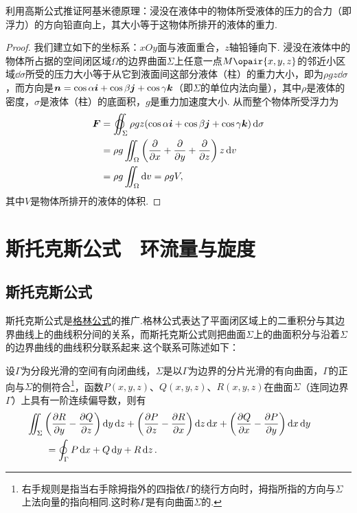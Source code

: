 \begin{example}
利用高斯公式推证阿基米德原理：浸没在液体中的物体所受液体的压力的合力（即浮力）的方向铅直向上，其大小等于这物体所排开的液体的重力.
\begin{proof}
我们建立如下的坐标系：\(xOy\)面与液面重合，\(z\)轴铅锤向下.
浸没在液体中的物体所占据的空间闭区域\(\Omega\)的边界曲面\(\Sigma\)上任意一点\(M\opair{x,y,z}\)的邻近小区域\(\dd{\sigma}\)所受的压力大小等于从它到液面间这部分液体（柱）的重力大小，即为\(\rho g z \dd{\sigma}\)，而方向是\(\boldsymbol{n}=\cos\alpha\boldsymbol{i}+\cos\beta\boldsymbol{j}+\cos\gamma\boldsymbol{k}\)（即\(\Sigma\)的单位内法向量），其中\(\rho\)是液体的密度，\(\sigma\)是液体（柱）的底面积，\(g\)是重力加速度大小.
从而整个物体所受浮力为\begin{align*}
\mat{F} &= \varoiint_{\Sigma} \rho g z (\cos\alpha\mat{i}+\cos\beta\mat{j}+\cos\gamma\mat{k}) \dd{\sigma} \\
&= \rho g \iint_{\Omega} \left(\pdv{x}+\pdv{y}+\pdv{z}\right) z \dd{v} \\
&= \rho g \iint_{\Omega} \dd{v}
= \rho g V,
\end{align*}其中\(V\)是物体所排开的液体的体积.
\end{proof}
\end{example}

\section{斯托克斯公式　环流量与旋度}
\subsection{斯托克斯公式}
斯托克斯公式是\hyperref[equation:线积分与面积分.格林公式]{格林公式}的推广.格林公式表达了平面闭区域上的二重积分与其边界曲线上的曲线积分间的关系，而斯托克斯公式则把曲面\(\Sigma\)上的曲面积分与沿着\(\Sigma\)的边界曲线的曲线积分联系起来.这个联系可陈述如下：

\begin{theorem}[斯托克斯公式]
设\(\Gamma\)为分段光滑的空间有向闭曲线，\(\Sigma\)是以\(\Gamma\)为边界的分片光滑的有向曲面，\(\Gamma\)的正向与\(\Sigma\)的侧符合\footnote{右手规则是指当右手除拇指外的四指依\(\Gamma\)的绕行方向时，拇指所指的方向与\(\Sigma\)上法向量的指向相同.这时称\(\Gamma\)是有向曲面\(\Sigma\)的.}，函数\(P(x,y,z)\)、\(Q(x,y,z)\)、\(R(x,y,z)\)在曲面\(\Sigma\)（连同边界\(\Gamma\)）上具有一阶连续偏导数，则有
\begin{equation}\label{equation:线积分与面积分.斯托克斯公式}
\begin{split}
&\hspace{-20pt}\iint_{\Sigma}
	\left( \pdv{R}{y} - \pdv{Q}{z} \right)\dd{y}\dd{z}
	+\left( \pdv{P}{z} - \pdv{R}{x} \right)\dd{z}\dd{x}
	+\left( \pdv{Q}{x} - \pdv{P}{y} \right)\dd{x}\dd{y} \\
&= \oint_{\Gamma} P\dd{x}+Q\dd{y}+R\dd{z}.
\end{split}
\end{equation}
\end{theorem}

